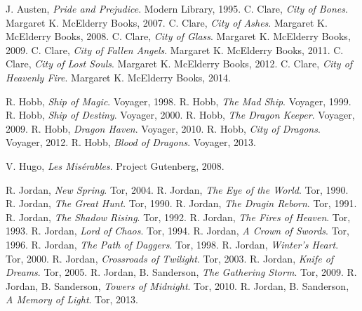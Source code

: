 \renewcommand{\bibname}{Analyzed books}
\begin{thebibliography}{47} 
     J. Austen,
    \emph{Pride and Prejudice}.
    Modern Library,
    1995.
    C. Clare,
    \emph{City of Bones}.
    Margaret K. McElderry Books,
    2007.
    C. Clare,
    \emph{City of Ashes}.
    Margaret K. McElderry Books,
    2008.
    C. Clare,
    \emph{City of Glass}.
    Margaret K. McElderry Books,
    2009.
    C. Clare,
    \emph{City of Fallen Angels}.
    Margaret K. McElderry Books,
    2011.
    C. Clare,
    \emph{City of Lost Souls}.
    Margaret K. McElderry Books,
    2012.
    C. Clare,
    \emph{City of Heavenly Fire}.
    Margaret K. McElderry Books,
    2014.

    R. Hobb,
    \emph{Ship of Magic}.
    Voyager,
    1998.
    R. Hobb,
    \emph{The Mad Ship}.
    Voyager,
    1999.
    R. Hobb,
    \emph{Ship of Destiny}.
    Voyager,
    2000.
    R. Hobb,
    \emph{The Dragon Keeper}.
    Voyager,
    2009.
    R. Hobb,
    \emph{Dragon Haven}.
    Voyager,
    2010.
    R. Hobb,
    \emph{City of Dragons}.
    Voyager,
    2012.
    R. Hobb,
    \emph{Blood of Dragons}.
    Voyager,
    2013.

    V. Hugo,
    \emph{Les Mis\'{e}rables}.
    Project Gutenberg, 
    2008. 
            
    R. Jordan,
    \emph{New Spring}.
    Tor,
    2004.
    R. Jordan,
    \emph{The Eye of the World}.
    Tor,
    1990.
    R. Jordan,
    \emph{The Great Hunt}.
    Tor,
    1990.
    R. Jordan,
    \emph{The Dragin Reborn}.
    Tor,
    1991.
    R. Jordan,
    \emph{The Shadow Rising}.
    Tor,
    1992.
    R. Jordan,
    \emph{The Fires of Heaven}.
    Tor,
    1993.
    R. Jordan,
    \emph{Lord of Chaos}.
    Tor,
    1994.
    R. Jordan,
    \emph{A Crown of Swords}.
    Tor,
    1996.
    R. Jordan,
    \emph{The Path of Daggers}.
    Tor,
    1998.
    R. Jordan,
    \emph{Winter's Heart}.
    Tor,
    2000.
    R. Jordan,
    \emph{Crossroads of Twilight}.
    Tor,
    2003.
    R. Jordan,
    \emph{Knife of Dreams}.
    Tor,
    2005.
    R. Jordan, B. Sanderson,
    \emph{The Gathering Storm}.
    Tor,
    2009.
    R. Jordan, B. Sanderson,
    \emph{Towers of Midnight}.
    Tor,
    2010.
    R. Jordan, B. Sanderson,
    \emph{A Memory of Light}.
    Tor,
    2013.


\end{thebibliography}
